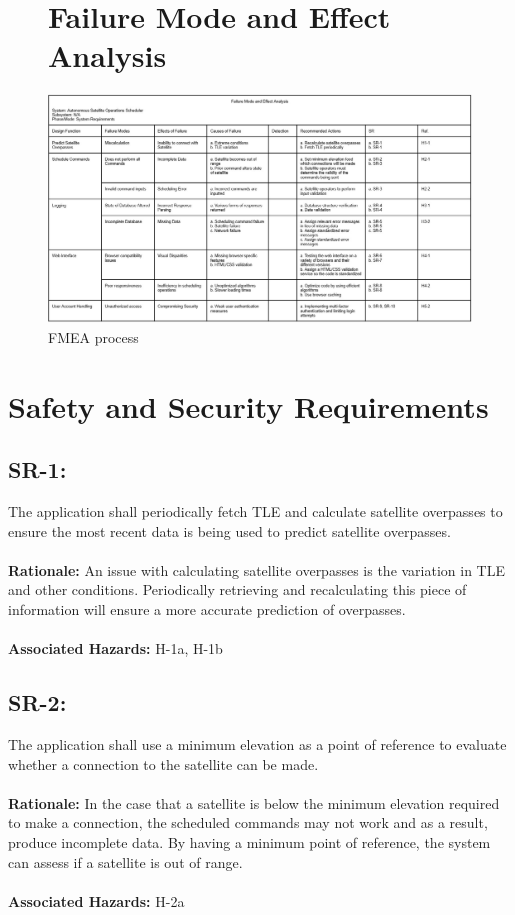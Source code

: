 \documentclass{article}
\begin{document}
\begin{landscape}
    \begin{figure}[p]
    \section{Failure Mode and Effect Analysis}
        \centering
        \includegraphics[width=1.16\linewidth]{FMEA.jpg}
        \caption{FMEA process}
        \label{fig:fmea_landscape}
    \end{figure}
\end{landscape}

\section{Safety and Security Requirements}

\subsection*{SR-1:}
The application shall periodically fetch TLE and calculate satellite overpasses to ensure the most recent data is being used to predict satellite overpasses. \\ \\
\textbf{Rationale:} An issue with calculating satellite overpasses is the variation in TLE and other conditions. Periodically retrieving and recalculating this piece of information will ensure a more accurate prediction of overpasses.  \\ \\
\textbf{Associated Hazards:}  H-1a, H-1b


\subsection*{SR-2:}
The application shall use a minimum elevation as a point of reference to evaluate whether a connection to the satellite can be made. \\ \\
\textbf{Rationale:} In the case that a satellite is below the minimum elevation required to make a connection, the scheduled commands may not work and as a result, produce incomplete data. By having a minimum point of reference, the system can assess if a satellite is out of range. \\ \\
\textbf{Associated Hazards:}  H-2a
\end{document}
